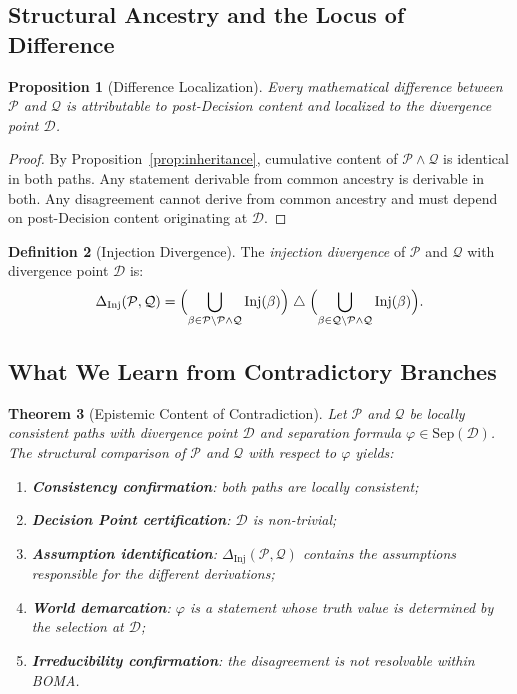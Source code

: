 \documentclass[12pt, a4paper]{article}
\theoremstyle{plain}
\newtheorem{theorem}{Theorem}[section]
\newtheorem{proposition}[theorem]{Proposition}
\theoremstyle{definition}
\newtheorem{definition}[theorem]{Definition}
\theoremstyle{remark}
\newcommand{\Inj}[1]{\mathrm{Inj}(#1)}
\newcommand{\CA}[2]{#1 \wedge #2}
\newcommand{\Sep}[1]{\mathrm{Sep}(#1)}
\newcommand{\BOMA}{\textsf{BOMA}}
\begin{document}
\subsection{Structural Ancestry and the Locus of Difference}
\label{subsec:ancestry}

\begin{proposition}[Difference Localization]
\label{prop:diff-localize}
Every mathematical difference between $\mathcal{P}$ and $\mathcal{Q}$
is attributable to post-Decision content and localized to the
divergence point $\mathcal{D}$.
\end{proposition}

\begin{proof}
By Proposition~\ref{prop:inheritance}, cumulative content of
$\CA{\mathcal{P}}{\mathcal{Q}}$ is identical in both paths. Any
statement derivable from common ancestry is derivable in both. Any
disagreement cannot derive from common ancestry and must depend on
post-Decision content originating at $\mathcal{D}$.
\end{proof}

\begin{definition}[Injection Divergence]
\label{def:inj-divergence}
The \emph{injection divergence} of $\mathcal{P}$ and $\mathcal{Q}$ with
divergence point $\mathcal{D}$ is:
\[
  \Delta_{\mathrm{Inj}}(\mathcal{P},\mathcal{Q})
  = \Bigl(
      \bigcup_{\beta \in \mathcal{P}\setminus\CA{\mathcal{P}}{\mathcal{Q}}}
        \Inj{\beta}
    \Bigr)
    \;\triangle\;
    \Bigl(
      \bigcup_{\beta \in \mathcal{Q}\setminus\CA{\mathcal{P}}{\mathcal{Q}}}
        \Inj{\beta}
    \Bigr).
\]
\end{definition}

\subsection{What We Learn from Contradictory Branches}
\label{subsec:learn}

\begin{theorem}[Epistemic Content of Contradiction]
\label{thm:epistemic}
Let $\mathcal{P}$ and $\mathcal{Q}$ be locally consistent paths with
divergence point $\mathcal{D}$ and separation formula
$\varphi \in \Sep{\mathcal{D}}$. The structural comparison of
$\mathcal{P}$ and $\mathcal{Q}$ with respect to $\varphi$ yields:
\begin{enumerate}
  \item \textbf{Consistency confirmation}: both paths are locally
        consistent;
  \item \textbf{Decision Point certification}: $\mathcal{D}$ is
        non-trivial;
  \item \textbf{Assumption identification}: $\Delta_{\mathrm{Inj}}
        (\mathcal{P},\mathcal{Q})$ contains the assumptions
        responsible for the different derivations;
  \item \textbf{World demarcation}: $\varphi$ is a statement whose
        truth value is determined by the selection at $\mathcal{D}$;
  \item \textbf{Irreducibility confirmation}: the disagreement is
        not resolvable within \BOMA{}.
\end{enumerate}
\end{theorem}
\end{document}
